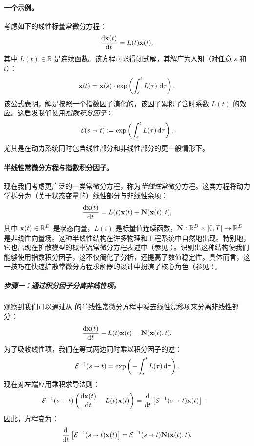 \paragraph{一个示例。}
考虑如下的线性标量常微分方程：
\[
\frac{\mathop{}\!\mathrm{d} {\mathbf{x}}(t)}{\mathop{}\!\mathrm{d} t} = L(t){\mathbf{x}}(t),
\]
其中 $L(t) \in \mathbb{R}$ 是连续函数。该方程可求得闭式解，其解广为人知（对任意 $s$ 和 $t$）：
\[
{\mathbf{x}}(t) = {\mathbf{x}}(s) \cdot \exp\left( \int_s^t L(\tau) \,\mathop{}\!\mathrm{d} \tau \right).
\]
该公式表明，解是按照一个指数因子演化的，该因子累积了含时系数 $L(t)$ 的效应。这启发我们使用\emph{指数积分因子}：
\begin{align}\label{eq:exp-int-factor}
    \mathcal{E}(s \shortrightarrow t) := \exp\left( \int_s^t L(\tau)\mathop{}\!\mathrm{d} \tau \right),
\end{align}
尤其是在动力系统同时包含线性部分和非线性部分的更一般情形下。



\paragraph{半线性常微分方程与指数积分因子。}
现在我们考虑更广泛的一类常微分方程，称为\emph{半线性}常微分方程。这类方程将动力学拆分为（关于状态变量的）线性部分与非线性余项：
\begin{align}\label{eq:semilinear-ode}
    \frac{\mathop{}\!\mathrm{d} {\mathbf{x}}(t)}{\mathop{}\!\mathrm{d} t} = L(t){\mathbf{x}}(t) + {\mathbf{N}}({\mathbf{x}}(t), t),
\end{align}
其中 ${\mathbf{x}}(t) \in \mathbb{R}^D$ 是状态向量，$L(t)$ 是标量值连续函数，${\mathbf{N}}: \mathbb{R}^D \times [0,T] \to \mathbb{R}^D$ 是非线性向量场。这种半线性结构在许多物理和工程系统中自然地出现。特别地，它也出现在扩散模型的概率流常微分方程表述中（参见 ）。识别出这种结构使我们能够使用指数积分因子，这不仅简化了分析，还提高了数值稳定性。具体而言，这一技巧在快速扩散常微分方程求解器的设计中扮演了核心角色（参见 ）。


\subparagraph{步骤一：通过积分因子分离非线性项。}
观察到我们可以通过从  的半线性常微分方程中减去线性漂移项来分离非线性部分：
\[
\frac{\mathop{}\!\mathrm{d} {\mathbf{x}}(t)}{\mathop{}\!\mathrm{d} t} - L(t){\mathbf{x}}(t) = {\mathbf{N}}({\mathbf{x}}(t), t).
\]
为了吸收线性项，我们在等式两边同时乘以积分因子的逆：
\[
\mathcal{E}^{-1}(s \shortrightarrow t) = \exp\left(-\int_s^t L(\tau)\mathop{}\!\mathrm{d} \tau \right).
\]
现在对左端应用乘积求导法则：
\begin{align*}
\mathcal{E}^{-1}(s \shortrightarrow t) \left( \frac{\mathop{}\!\mathrm{d} {\mathbf{x}}(t)}{\mathop{}\!\mathrm{d} t} - L(t){\mathbf{x}}(t) \right)
&= \frac{\mathop{}\!\mathrm{d}}{\mathop{}\!\mathrm{d} t} \left[ \mathcal{E}^{-1}(s \shortrightarrow t) {\mathbf{x}}(t) \right].
\end{align*}
因此，方程变为：
\[
\frac{\mathop{}\!\mathrm{d}}{\mathop{}\!\mathrm{d} t} \left[ \mathcal{E}^{-1}(s \shortrightarrow t) {\mathbf{x}}(t) \right]
= \mathcal{E}^{-1}(s \shortrightarrow t) {\mathbf{N}}({\mathbf{x}}(t), t).
\]

